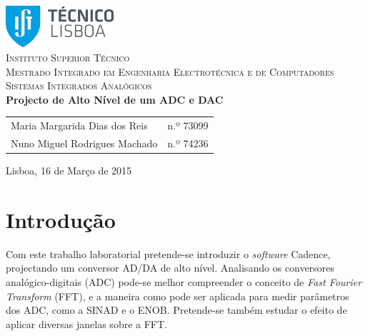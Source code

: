\documentclass[11pt]{article}
\numberwithin{equation}{section}
\begin{document}
\begin{titlepage}
\begin{center}

\hfill \break
\hfill \break

\includegraphics[width=0.3\textwidth]{./logo}~\\[1cm]

\textsc{\LARGE Instituto Superior Técnico}\\[0.25cm]
\textsc{\Large Mestrado Integrado em Engenharia Electrotécnica e de Computadores}\\[1.8cm]
\textsc{\huge Sistemas Integrados Analógicos}\\[0.25cm]

{\huge \bfseries Projecto de Alto Nível de um ADC e DAC \\[1cm]}

\begin{tabular}{ l l }
Maria Margarida Dias dos Reis & \hspace{2mm} n.º 73099 \\
Nuno Miguel Rodrigues Machado & \hspace{2mm} n.º 74236

\end{tabular}

\vfill

{\large Lisboa, 16 de Março de 2015} 

\end{center}
\end{titlepage}

\clearpage

\tableofcontents
\pagebreak

\clearpage
{}

\section{Introdução}

Com este trabalho laboratorial pretende-se introduzir o \textit{software} Cadence, projectando um conversor AD/DA de alto nível. Analisando os conversores analógico-digitais (ADC) pode-se melhor compreender o conceito de \textit{Fast Fourier Transform} (FFT), e a maneira como pode ser aplicada para medir parâmetros dos ADC, como a SINAD e o ENOB. Pretende-se também estudar o efeito de aplicar diversas janelas sobre a FFT.
\end{document}
